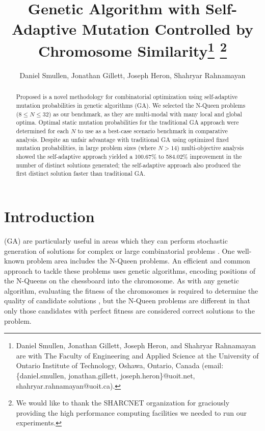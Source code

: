 \documentclass[conference]{IEEEtran}
\begin{document}
\title{\ \\ \LARGE\bf Genetic Algorithm with Self-Adaptive Mutation Controlled by Chromosome Similarity\thanks{Daniel Smullen, Jonathan Gillett, Joseph Heron, and Shahryar Rahnamayan are with The Faculty of Engineering and Applied Science at the University of Ontario Institute of Technology, Oshawa, Ontario, Canada (email: \{daniel.smullen, jonathan.gillett, joseph.heron\}@uoit.net, shahryar.rahnamayan@uoit.ca).} \thanks{We would like to thank the SHARCNET organization for graciously providing the high performance computing facilities we needed to run our experiments.}}

\author{Daniel Smullen, Jonathan Gillett, Joseph Heron, Shahryar Rahnamayan}


\maketitle

\begin{abstract}
Proposed is a novel methodology for combinatorial optimization using self-adaptive mutation probabilities in genetic algorithms (GA). We selected the N-Queen problems ($8 \leq N \leq 32$) as our benchmark, as they are multi-modal with many local and global optima. Optimal static mutation probabilities for the traditional GA approach were determined for each $N$ to use as a best-case scenario benchmark in comparative analysis. Despite an unfair advantage with traditional GA using optimized fixed mutation probabilities, in large problem sizes (where $N > 14$) multi-objective analysis showed the self-adaptive approach yielded a 100.67\% to 584.02\% improvement in the number of distinct solutions generated; the self-adaptive approach also produced the first distinct solution faster than traditional GA.
\end{abstract}


\section{Introduction}
 (GA) are particularly useful in areas which they can perform stochastic generation of solutions for complex or large combinatorial problems \cite{de1989using,crawford1992solving}. One well-known problem area includes the N-Queen problems. An efficient and common approach to tackle these problems uses genetic algorithms, encoding positions of the N-Queens on the chessboard into the chromosome. As with any genetic algorithm, evaluating the fitness of the chromosomes is required to determine the quality of candidate solutions \cite{srinivas1994genetic}, but the N-Queen problems are different in that only those candidates with perfect fitness are considered correct solutions to the problem. 
\end{document}
